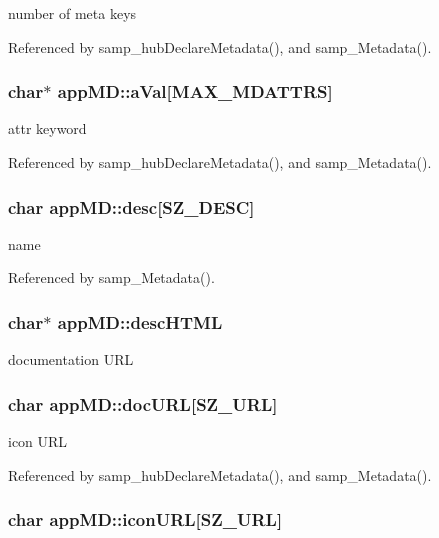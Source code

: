 number of meta keys 

Referenced by samp\_\-hubDeclareMetadata(), and samp\_\-Metadata().\hypertarget{structappMD_7359c333bffd1d2a9166b738bba85683}{
\subsubsection[{aVal}]{\setlength{\rightskip}{0pt plus 5cm}char$\ast$ {\bf appMD::aVal}\mbox{[}MAX\_\-MDATTRS\mbox{]}}}
\label{structappMD_7359c333bffd1d2a9166b738bba85683}


attr keyword 

Referenced by samp\_\-hubDeclareMetadata(), and samp\_\-Metadata().\hypertarget{structappMD_48da832ef8b712799c6116a7b68b2af2}{
\subsubsection[{desc}]{\setlength{\rightskip}{0pt plus 5cm}char {\bf appMD::desc}\mbox{[}SZ\_\-DESC\mbox{]}}}
\label{structappMD_48da832ef8b712799c6116a7b68b2af2}


name 

Referenced by samp\_\-Metadata().\hypertarget{structappMD_7bc6e0aa888da1fb24f7d408d14ea814}{
\subsubsection[{descHTML}]{\setlength{\rightskip}{0pt plus 5cm}char$\ast$ {\bf appMD::descHTML}}}
\label{structappMD_7bc6e0aa888da1fb24f7d408d14ea814}


documentation URL \hypertarget{structappMD_af239c547b2c9344777146526d2112f8}{
\subsubsection[{docURL}]{\setlength{\rightskip}{0pt plus 5cm}char {\bf appMD::docURL}\mbox{[}SZ\_\-URL\mbox{]}}}
\label{structappMD_af239c547b2c9344777146526d2112f8}


icon URL 

Referenced by samp\_\-hubDeclareMetadata(), and samp\_\-Metadata().\hypertarget{structappMD_dd9526ffaf4770718df3af848969991b}{
\subsubsection[{iconURL}]{\setlength{\rightskip}{0pt plus 5cm}char {\bf appMD::iconURL}\mbox{[}SZ\_\-URL\mbox{]}}}
\label{structappMD_dd9526ffaf4770718df3af848969991b}


